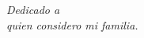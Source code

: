 
\chapter*{}
\begin{flushright}
\textit{Dedicado a \\
quien considero mi familia.}
\end{flushright}

